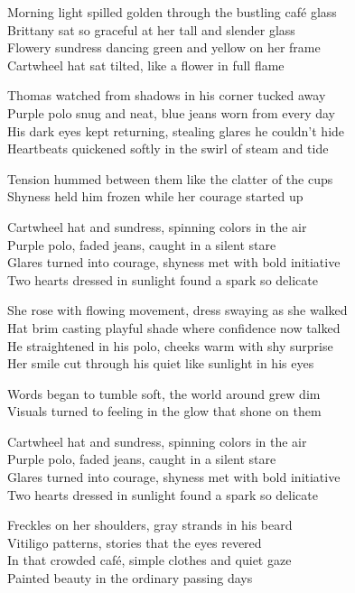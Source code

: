 \begin{lyrics}

Morning light spilled golden through the bustling café glass\\
Brittany sat so graceful at her tall and slender glass\\
Flowery sundress dancing green and yellow on her frame\\
Cartwheel hat sat tilted, like a flower in full flame

Thomas watched from shadows in his corner tucked away\\
Purple polo snug and neat, blue jeans worn from every day\\
His dark eyes kept returning, stealing glares he couldn’t hide\\
Heartbeats quickened softly in the swirl of steam and tide

Tension hummed between them like the clatter of the cups\\
Shyness held him frozen while her courage started up

Cartwheel hat and sundress, spinning colors in the air\\
Purple polo, faded jeans, caught in a silent stare\\
Glares turned into courage, shyness met with bold initiative\\
Two hearts dressed in sunlight found a spark so delicate

She rose with flowing movement, dress swaying as she walked\\
Hat brim casting playful shade where confidence now talked\\
He straightened in his polo, cheeks warm with shy surprise\\
Her smile cut through his quiet like sunlight in his eyes

Words began to tumble soft, the world around grew dim\\
Visuals turned to feeling in the glow that shone on them

Cartwheel hat and sundress, spinning colors in the air\\
Purple polo, faded jeans, caught in a silent stare\\
Glares turned into courage, shyness met with bold initiative\\
Two hearts dressed in sunlight found a spark so delicate

Freckles on her shoulders, gray strands in his beard\\
Vitiligo patterns, stories that the eyes revered\\
In that crowded café, simple clothes and quiet gaze\\
Painted beauty in the ordinary passing days


\end{lyrics}
